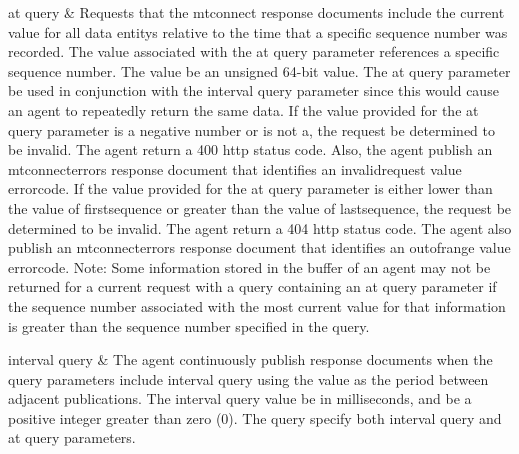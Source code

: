 \documentclass{mtconnect}	%
\begin{document}
\begin{longtabu}
\gls{at query}
&
Requests that the \glspl{mtconnect response document} \MUST include the current value for all \glspl{data entity} relative to the time that a specific \gls{sequence number} was recorded.
\newline The value associated with the \gls{at query} parameter references a specific \gls{sequence number}.  The value \MUST be an unsigned 64-bit value.
\newline The \gls{at query} parameter \MUSTNOT be used in conjunction with the \gls{interval query} parameter since this would cause an \gls{agent} to repeatedly return the same data. 
\newline If the value provided for the \gls{at query} parameter is a negative number or is not a, the \gls{request} \MUST be determined to be invalid.  The \gls{agent} \MUST return a 400 \gls{http status code}.  Also, the \gls{agent} \MUST publish an \gls{mtconnecterrors response document} that identifies an \gls{invalidrequest value} \gls{errorcode}. 
\newline If the value provided for the \gls{at query} parameter is either lower than the value of \gls{firstsequence} or greater than the value of \gls{lastsequence}, the \gls{request} \MUST be determined to be invalid.  The \gls{agent} \MUST return a 404 \gls{http status code}.  The \gls{agent} \MUST also publish an \gls{mtconnecterrors response document} that identifies an \gls{outofrange value} \gls{errorcode}. 
\newline Note:  Some information stored in the \gls{buffer} of an \gls{agent} may not be returned for a \gls{current request} with a \gls{query} containing an \gls{at query} parameter if the \gls{sequence number} associated with the most current value for that information is greater than the \gls{sequence number} specified in the \gls{query}.
\\ \hline

\gls{interval query}
&
The \gls{agent} \MUST continuously publish \glspl{response document} when the query parameters include \gls{interval query} using the value as the period between adjacent publications.
\newline The \gls{interval query} value \MUST be in milliseconds, and \MUST be a positive integer greater than zero (0).
\newline The \gls{query} \MUSTNOT specify both \gls{interval query} and \gls{at query} parameters. \\
\hline
\end{longtabu}
\end{document}
